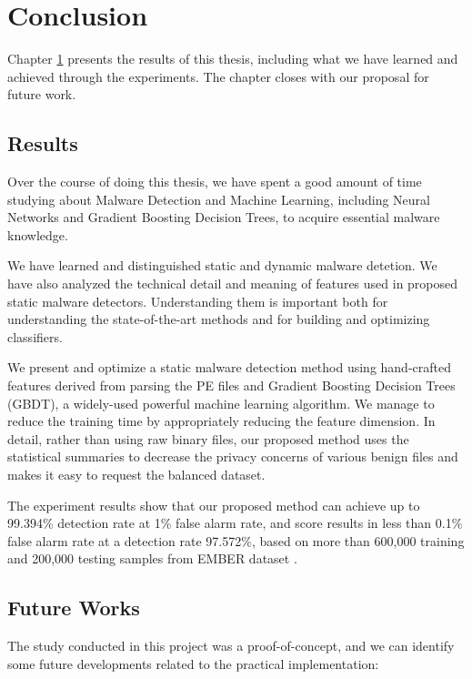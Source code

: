 \chapter{Conclusion} 
\label{chap:conclusion}

\begin{chapabstract}
Chapter \ref{chap:conclusion} presents the results of this thesis, including what we have learned and achieved through the experiments. The chapter closes with our proposal for future work.
\end{chapabstract}

\section{Results}

Over the course of doing this thesis, we have spent a good amount of time studying about Malware Detection and Machine Learning, including Neural Networks and Gradient Boosting Decision Trees, to acquire essential malware knowledge. 

We have learned and distinguished static and dynamic malware detetion. We have also analyzed the technical detail and meaning of features used in proposed static malware detectors. Understanding them is important both for understanding the state-of-the-art methods and for building and optimizing classifiers.

We present and optimize a static malware detection method using hand-crafted features derived from parsing the PE files and Gradient Boosting Decision Trees (GBDT), a widely-used powerful machine learning algorithm.
We manage to reduce the training time by appropriately reducing the feature dimension. 
In detail, rather than using raw binary files, our proposed method uses the statistical summaries to decrease the privacy concerns of various benign files and makes it easy to request the balanced dataset. 

The experiment results show that our proposed method can achieve up to 99.394\% detection rate at 1\% false alarm rate, and score results in less than 0.1\% false alarm rate at a detection rate 97.572\%, based on more than 600,000 training and 200,000 testing samples from EMBER dataset \cite{anderson2018ember}.

\section{Future Works}

The study conducted in this project was a proof-of-concept, and we can identify some future developments related to the practical implementation:


